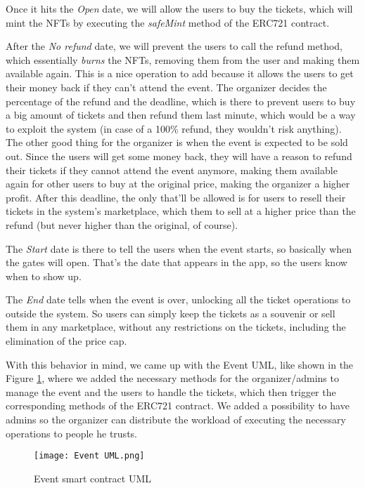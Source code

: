 Once it hits the \textit{Open} date, we will allow the users to buy the tickets, which will mint the NFTs by executing the \textit{safeMint} method of the ERC721 contract.

After the \textit{No refund} date, we will prevent the users to call the refund method, which essentially \textit{burns} the NFTs, removing them from the user and making them available again.
This is a nice operation to add because it allows the users to get their money back if they can't attend the event. The organizer decides the percentage of the refund and the deadline, which is there to prevent users to buy a big amount of tickets and then refund them last minute, which would be a way to exploit the system (in case of a 100\% refund, they wouldn't risk anything).
The other good thing for the organizer is when the event is expected to be sold out. Since the users will get some money back, they will have a reason to refund their tickets if they cannot attend the event anymore, making them available again for other users to buy at the original price, making the organizer a higher profit.
After this deadline, the only that'll be allowed is for users to resell their tickets in the system's marketplace, which them to sell at a higher price than the refund (but never higher than the original, of course).

The \textit{Start} date is there to tell the users when the event starts, so basically when the gates will open. That's the date that appears in the app, so the users know when to show up.

The \textit{End} date tells when the event is over, unlocking all the ticket operations to outside the system. So users can simply keep the tickets as a souvenir or sell them in any marketplace, without any restrictions on the tickets, including the elimination of the price cap.

With this behavior in mind, we came up with the Event UML, like shown in the Figure \ref{fig:event_uml}, where we added the necessary methods for the organizer/admins to manage the event and the users to handle the tickets, which then trigger the corresponding methods of the ERC721 contract. We added a possibility to have admins so the organizer can distribute the workload of executing the necessary operations to people he trusts.

\begin{figure}[H]
    \texttt{[image: Event UML.png]}
    \centering
    \caption{Event smart contract UML}
    \label{fig:event_uml}
\end{figure}

